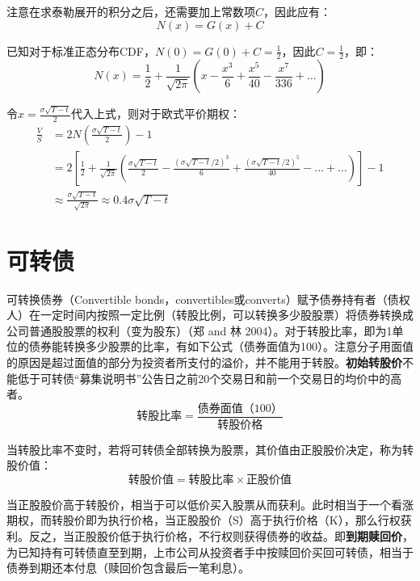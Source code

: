 \documentclass[11pt]{article}
\begin{document}
注意在求泰勒展开的积分之后，还需要加上常数项$C$，因此应有：
\begin{equation*}
    N(x) = G(x) + C
\end{equation*}

已知对于标准正态分布CDF，$N(0) = G(0) + C = \frac{1}{2}$，因此$C=\frac{1}{2}$，即：
\begin{equation*}
   N(x) = \frac{1}{2} + \frac{1}{\sqrt{2\pi}} \left( x -\frac{x^3}{6} + \frac{x^5}{40} - \frac{x^7}{336} + \dots \right) 
\end{equation*}

令$x=\frac{\sigma\sqrt{T-t}}{2}$代入上式，则对于欧式平价期权：
\begin{align*}
    \frac{V}{S} & = 2N\left( \frac{\sigma\sqrt{T-t}}{2} \right) - 1 \\
    & = 2\left[\frac{1}{2} + \frac{1}{\sqrt{2\pi}} \left(\frac{\sigma\sqrt{T-t}}{2} - \frac{(\sigma\sqrt{T-t}/2)^3}{6} + \frac{(\sigma\sqrt{T-t}/2)^5}{40} - \dots + \dots\right) \right] - 1\\
    &\approx \frac{\sigma\sqrt{T-t}}{\sqrt{2\pi}} \approx 0.4\sigma\sqrt{T-t}
\end{align*}

\section{可转债}

可转换债券（Convertible bonds，convertibles或converts）赋予债券持有者（债权人）在一定时间内按照一定比例（转股比例，可以转换多少股股票）将债券转换成公司普通股股票的权利（变为股东）（郑 and 林 2004）。对于转股比率，即为1单位的债券能转换多少股票的比率，有如下公式（债券面值为100）。注意分子用面值的原因是超过面值的部分为投资者所支付的溢价，并不能用于转股。\textbf{初始转股价}不能低于可转债“募集说明书”公告日之前20个交易日和前一个交易日的均价中的高者。
\begin{equation*}
    \text{转股比率} = \frac{\text{债券面值（100）}}{\text{转股价格}}
\end{equation*}

当转股比率不变时，若将可转债全部转换为股票，其价值由正股股价决定，称为转股价值：
\begin{equation*}
    \text{转股价值} = \text{转股比率} \times \text{正股价值}
\end{equation*}

当正股股价高于转股价，相当于可以低价买入股票从而获利。此时相当于一个看涨期权，而转股价即为执行价格，当正股股价（S）高于执行价格（K），那么行权获利。反之，当正股股价低于执行价格，不行权则获得债券的收益。即\textbf{到期赎回价}，为已知持有可转债直至到期，上市公司从投资者手中按赎回价买回可转债，相当于债券到期还本付息（赎回价包含最后一笔利息）。
\end{document}
